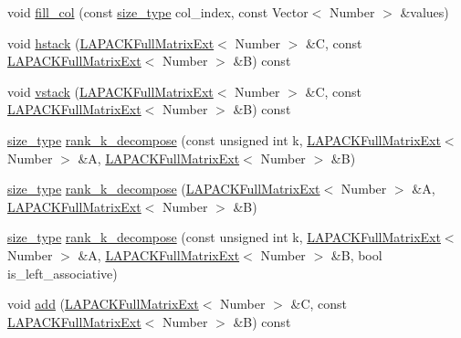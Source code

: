\begin{DoxyCompactItemize}
\item 
void \hyperlink{classLAPACKFullMatrixExt_a15180c6e8165380739735b6a7e4d1c32}{fill\+\_\+col} (const \hyperlink{classLAPACKFullMatrixExt_a5cf5f4a6104dc17029210b5ca52bf574}{size\+\_\+type} col\+\_\+index, const Vector$<$ Number $>$ \&values)
\item 
void \hyperlink{classLAPACKFullMatrixExt_aeeae2d2698007889a47f192043adb75c}{hstack} (\hyperlink{classLAPACKFullMatrixExt}{L\+A\+P\+A\+C\+K\+Full\+Matrix\+Ext}$<$ Number $>$ \&C, const \hyperlink{classLAPACKFullMatrixExt}{L\+A\+P\+A\+C\+K\+Full\+Matrix\+Ext}$<$ Number $>$ \&B) const
\item 
void \hyperlink{classLAPACKFullMatrixExt_a0f315932c3729240d03bc941bb2de849}{vstack} (\hyperlink{classLAPACKFullMatrixExt}{L\+A\+P\+A\+C\+K\+Full\+Matrix\+Ext}$<$ Number $>$ \&C, const \hyperlink{classLAPACKFullMatrixExt}{L\+A\+P\+A\+C\+K\+Full\+Matrix\+Ext}$<$ Number $>$ \&B) const
\item 
\hyperlink{classLAPACKFullMatrixExt_a5cf5f4a6104dc17029210b5ca52bf574}{size\+\_\+type} \hyperlink{classLAPACKFullMatrixExt_ab28877de241a7f5f901fa612c6352ce9}{rank\+\_\+k\+\_\+decompose} (const unsigned int k, \hyperlink{classLAPACKFullMatrixExt}{L\+A\+P\+A\+C\+K\+Full\+Matrix\+Ext}$<$ Number $>$ \&A, \hyperlink{classLAPACKFullMatrixExt}{L\+A\+P\+A\+C\+K\+Full\+Matrix\+Ext}$<$ Number $>$ \&B)
\item 
\hyperlink{classLAPACKFullMatrixExt_a5cf5f4a6104dc17029210b5ca52bf574}{size\+\_\+type} \hyperlink{classLAPACKFullMatrixExt_af4406db24d0924c5f7e891336bfbcffe}{rank\+\_\+k\+\_\+decompose} (\hyperlink{classLAPACKFullMatrixExt}{L\+A\+P\+A\+C\+K\+Full\+Matrix\+Ext}$<$ Number $>$ \&A, \hyperlink{classLAPACKFullMatrixExt}{L\+A\+P\+A\+C\+K\+Full\+Matrix\+Ext}$<$ Number $>$ \&B)
\item 
\hyperlink{classLAPACKFullMatrixExt_a5cf5f4a6104dc17029210b5ca52bf574}{size\+\_\+type} \hyperlink{classLAPACKFullMatrixExt_aba252fd1854009998639c21c969909d8}{rank\+\_\+k\+\_\+decompose} (const unsigned int k, \hyperlink{classLAPACKFullMatrixExt}{L\+A\+P\+A\+C\+K\+Full\+Matrix\+Ext}$<$ Number $>$ \&A, \hyperlink{classLAPACKFullMatrixExt}{L\+A\+P\+A\+C\+K\+Full\+Matrix\+Ext}$<$ Number $>$ \&B, bool is\+\_\+left\+\_\+associative)
\item 
void \hyperlink{classLAPACKFullMatrixExt_a824a7a919666c8af3df5723175f6201e}{add} (\hyperlink{classLAPACKFullMatrixExt}{L\+A\+P\+A\+C\+K\+Full\+Matrix\+Ext}$<$ Number $>$ \&C, const \hyperlink{classLAPACKFullMatrixExt}{L\+A\+P\+A\+C\+K\+Full\+Matrix\+Ext}$<$ Number $>$ \&B) const

\end{DoxyCompactItemize}
